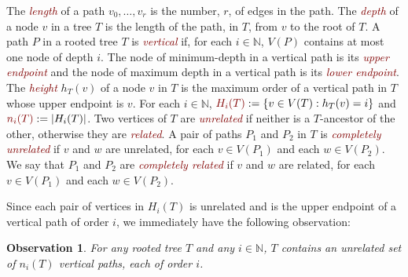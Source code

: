 \documentclass[kpfonts,lotsofwhite]{patmorin}
\newcommand{\defn}[1]{\textcolor{Maroon}{\emph{#1}}}
\newcommand{\mathdefn}[1]{\textcolor{Maroon}{#1}}
\newcommand{\N}{\mathbb{N}}
\DeclarePairedDelimiter{\floor}{\lfloor}{\rfloor}
\newcommand{\PP}{\mathcal{P}}
\theoremstyle{plain}
\newtheorem{obs}[thm]{Observation}
\theoremstyle{definition}
\begin{document}

The \defn{length} of a path $v_0,\ldots,v_r$ is the number, $r$, of edges in the path. The \defn{depth} of a node $v$ in a tree $T$ is the length of the path, in $T$, from $v$ to the root of $T$. A path $P$ in a rooted tree $T$ is \defn{vertical} if, for each $i\in\N$, $V(P)$ contains at most one node of depth $i$. The node of minimum-depth in a vertical path is its \defn{upper endpoint} and the node of maximum depth in a vertical path is its \defn{lower endpoint}.  The \defn{height} $h_T(v)$ of a node $v$ in $T$ is the maximum order of a vertical path in $T$ whose upper endpoint is $v$.  For each $i\in\N$, $\mathdefn{H_i(T)}:=\{v\in V(T):h_T(v)=i\}$ and $\mathdefn{n_i(T)}:=|H_i(T)|$.  Two vertices of $T$ are \defn{unrelated} if neither is a $T$-ancestor of the other, otherwise they are \defn{related}.  A pair of paths $P_1$ and $P_2$ in $T$ is \defn{completely unrelated} if $v$ and $w$ are unrelated, for each $v\in V(P_1)$ and each $w\in V(P_2)$.  We say that $P_1$ and $P_2$ are \defn{completely related} if $v$ and $w$ are related, for each $v\in V(P_1)$ and each $w\in V(P_2)$.



Since each pair of vertices in $H_i(T)$ is unrelated and is the upper endpoint of a vertical path of order $i$, we immediately have the following observation:

\begin{obs}\label{same_height_unrelated}
  For any rooted tree $T$ and any $i\in\N$, $T$ contains an unrelated set of $n_i(T)$ vertical paths, each of order $i$.
\end{obs}
\end{document}
